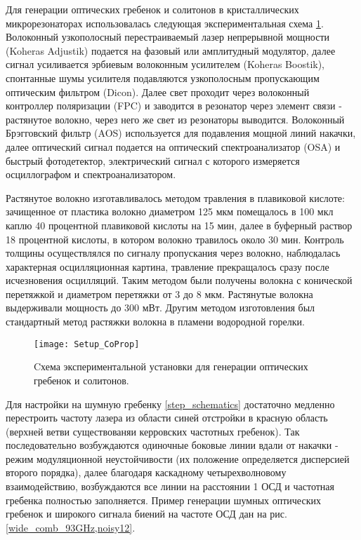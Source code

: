 Для генерации оптических гребенок и солитонов в кристаллических микрорезонаторах использовалась следующая экспериментальная схема \ref{Setup_CoProp}. Волоконный узкополосный перестраиваемый лазер непрерывной мощности (Koheras Adjustik) подается на фазовый или амплитудный модулятор, далее сигнал усиливается эрбиевым волоконным усилителем (Koheras Boostik), спонтанные шумы усилителя подавляются узкополосным пропускающим оптическим фильтром (Dicon). Далее свет проходит через волоконный контроллер поляризации (FPC) и заводится в резонатор через элемент связи - растянутое волокно, через него же свет из резонаторы выводится. Волоконный Брэгговский фильтр (AOS) используется для подавления мощной линий накачки, далее оптический сигнал подается на оптический спектроанализатор (OSA) и быстрый фотодетектор, электрический сигнал с которого измеряется осциллографом и спектроанализатором.

Растянутое волокно изготавливалось методом травления в плавиковой кислоте: зачищенное от пластика волокно диаметром 125 мкм помещалось в 100 мкл каплю 40 процентной плавиковой кислоты на 15 мин, далее в буферный раствор 18 процентной кислоты, в котором волокно травилось около 30 мин. Контроль толщины осуществлялся по сигналу пропускания через волокно, наблюдалась характерная осцилляционная картина, травление прекращалось сразу после исчезновения осцилляций. Таким методом были получены волокна с конической перетяжкой и диаметром перетяжки от 3 до 8 мкм. Растянутые волокна выдерживали мощность до 300 мВт. Другим методом изготовления был стандартный метод растяжки волокна в пламени водородной горелки.

\begin{figure}[ht]
\centering
  \texttt{[image: Setup\_CoProp]}
  \caption{Cхема экспериментальной установки для генерации оптических гребенок и солитонов.}
  \label{Setup_CoProp}
\end{figure}

Для настройки на шумную гребенку \ref{step_schematics} достаточно медленно перестроить частоту лазера из области синей отстройки в красную область (верхней ветви существованяи керровских частотных гребенок). Так последовательно возбуждаются одиночные боковые линии вдали от накачки - режим модуляционной неустойчивости (их положение определяется дисперсией второго порядка), далее благодаря каскадному четырехволновому взаимодействию, возбуждаются все линии на расстоянии 1 ОСД и частотная гребенка полностью заполняется. Пример генерации шумных оптических гребенок и широкого сигнала биений на частоте ОСД дан на рис. \ref{wide_comb_93GHz,noisy12}.

